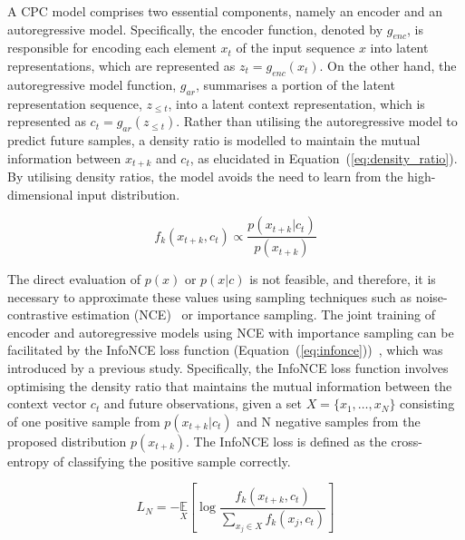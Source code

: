A CPC model comprises two essential components, namely an encoder and an autoregressive model. Specifically, the encoder function, denoted by $g_{enc}$, is responsible for encoding each element $x_t$ of the input sequence $x$ into latent representations, which are represented as $z_t = g_{enc}(x_t)$. On the other hand, the autoregressive model function, $g_{ar}$, summarises a portion of the latent representation sequence, $z_{\le t}$, into a latent context representation, which is represented as $c_t = g_{ar}(z_{\le t})$. Rather than utilising the autoregressive model to predict future samples, a density ratio is modelled to maintain the mutual information between $x_{t+k}$ and $c_t$, as elucidated in Equation~(\ref{eq:density_ratio}). By utilising density ratios, the model avoids the need to learn from the high-dimensional input distribution.

\begin{equation}
	f_k(x_{t+k},c_t) \propto \frac{p(x_{t+k}|c_t)}{p(x_{t+k})}
	\label{eq:density_ratio}
\end{equation}

The direct evaluation of $p(x)$ or $p(x|c)$ is not feasible, and therefore, it is necessary to approximate these values using sampling techniques such as noise-contrastive estimation (NCE)~\citep{gutmann2010noise} or importance sampling. The joint training of encoder and autoregressive models using NCE with importance sampling can be facilitated by the InfoNCE loss function (Equation~(\ref{eq:infonce}))~\citep{oord2018representation}, which was introduced by a previous study. Specifically, the InfoNCE loss function involves optimising the density ratio that maintains the mutual information between the context vector $c_t$ and future observations, given a set $X = \{x_1,…,x_N\}$ consisting of one positive sample from $p(x_{t+k}|c_t)$ and N negative samples from the proposed distribution $p(x_{t+k})$. The InfoNCE loss is defined as the cross-entropy of classifying the positive sample correctly.

\begin{equation}
	L_N=-\underset{X}{\mathbb{E}}\left[\log\frac{f_k(x_{t+k},c_t)}{\sum_{x_j\in X}f_k(x_j,c_t)}\right]
	\label{eq:infonce}
\end{equation}


